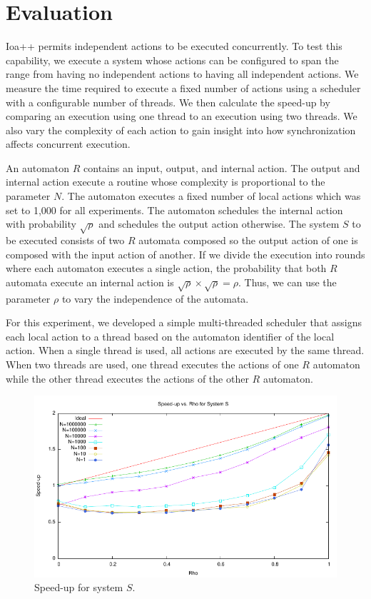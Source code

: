 \section{Evaluation\label{evaluation}}

Ioa++ permits independent actions to be executed concurrently.
To test this capability, we execute a system whose actions can be configured to span the range from having no independent actions to having all independent actions.
We measure the time required to execute a fixed number of actions using a scheduler with a configurable number of threads.
We then calculate the speed-up by comparing an execution using one thread to an execution using two threads.
We also vary the complexity of each action to gain insight into how synchronization affects concurrent execution.

An automaton $R$ contains an input, output, and internal action.
The output and internal action execute a routine whose complexity is proportional to the parameter $N$.
The automaton executes a fixed number of local actions which was set to 1,000 for all experiments.
The automaton schedules the internal action with probability $\sqrt{\rho}$ and schedules the output action otherwise.
The system $S$ to be executed consists of two $R$ automata composed so the output action of one is composed with the input action of another.
If we divide the execution into rounds where each automaton executes a single action, the probability that both $R$ automata execute an internal action is $\sqrt{\rho} \times \sqrt{\rho} = \rho$.
Thus, we can use the parameter $\rho$ to vary the independence of the automata.

For this experiment, we developed a simple multi-threaded scheduler that assigns each local action to a thread based on the automaton identifier of the local action.
When a single thread is used, all actions are executed by the same thread.
When two threads are used, one thread executes the actions of one $R$ automaton while the other thread executes the actions of the other $R$ automaton.

\begin{figure}
\center
\includegraphics[width=\textwidth]{speed_up}
\caption{Speed-up for system $S$.\label{speed_up}}
\end{figure}


